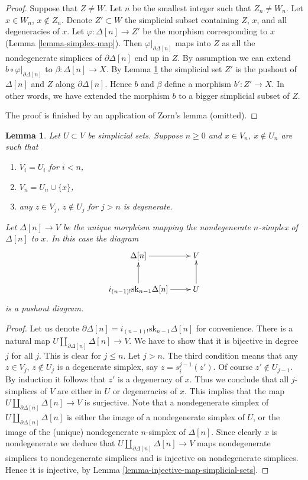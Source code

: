 \documentclass{stacks-project}
\theoremstyle{plain}
\newtheorem{lemma}[subsection]{Lemma}
\theoremstyle{definition}
\theoremstyle{remark}
\numberwithin{equation}{subsection}
\begin{document}
\begin{proof}
Suppose that $Z \not = W$. Let $n$ be the smallest integer such that
$Z_n \not = W_n$. Let $x \in W_n$, $x \not \in Z_n$. Denote
$Z' \subset W$ the simplicial subset containing $Z$, $x$, and
all degeneracies of $x$. Let
$\varphi : \Delta[n] \to Z'$ be the morphism corresponding to $x$
(Lemma \ref{lemma-simplex-map}).
Then $\varphi|_{\partial \Delta[n]}$ maps into $Z$
as all the nondegenerate simplices of $\partial \Delta[n]$ end up in $Z$.
By assumption we can extend $b \circ \varphi|_{\partial \Delta[n]}$
to $\beta : \Delta[n] \to X$.
By Lemma \ref{lemma-glue-simplex} the simplicial set $Z'$
is the pushout of $\Delta[n]$ and $Z$ along $\partial \Delta[n]$.
Hence $b$ and $\beta$ define a morphism $b' : Z' \to X$.
In other words, we have extended the morphism $b$ to a bigger
simplicial subset of $Z$.

\medskip\noindent
The proof is finished by an application of Zorn's lemma (omitted).
\end{proof}

\begin{lemma}
\label{lemma-glue-simplex}
Let $U \subset V$ be simplicial sets.
Suppose $n \geq 0$ and $x \in V_n$, $x \not \in U_n$ are such that
\begin{enumerate}
\item $V_i = U_i$ for $i < n$,
\item $V_n = U_n \cup \{x\}$,
\item any $z \in V_j$, $z \not \in U_j$ for $j > n$
is degenerate.
\end{enumerate}
Let $\Delta[n] \to V$ be the unique morphism mapping the
nondegenerate $n$-simplex of $\Delta[n]$ to $x$.
In this case the diagram
$$
\xymatrix{
\Delta[n] \ar[r] & V \\
i_{(n - 1)!} \text{sk}_{n - 1} \Delta[n] \ar[r] \ar[u] & U \ar[u]
}
$$
is a pushout diagram.
\end{lemma}

\begin{proof}
Let us denote $\partial \Delta[n] = i_{(n - 1)!} \text{sk}_{n - 1} \Delta[n]$
for convenience. There is a natural map
$U \amalg_{\partial \Delta[n]} \Delta[n] \to V$.
We have to show that it is bijective in degree $j$
for all $j$. This is clear for $j \leq n$. Let $j > n$.
The third condition means that any $z \in V_j$, $z \not \in U_j$
is a degenerate simplex, say $z = s^{j - 1}_i(z')$. Of course
$z' \not \in U_{j - 1}$. By induction it follows that $z'$
is a degeneracy of $x$. Thus we conclude that all $j$-simplices
of $V$ are either in $U$ or degeneracies of $x$. This implies
that the map $U \amalg_{\partial \Delta[n]} \Delta[n] \to V$
is surjective. Note that a nondegenerate simplex of
$U \amalg_{\partial \Delta[n]} \Delta[n]$ is either
the image of a nondegenerate simplex of $U$, or
the image of the (unique) nondegenerate $n$-simplex
of $\Delta[n]$. Since clearly $x$ is nondegenerate we
deduce that $U \amalg_{\partial \Delta[n]} \Delta[n] \to V$
maps nondegenerate simplices to nondegenerate simplices
and is injective on nondegenerate simplices. Hence it is
injective, by Lemma \ref{lemma-injective-map-simplicial-sets}.
\end{proof}
\end{document}
